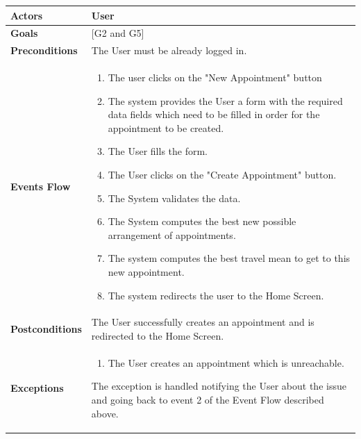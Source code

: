 \documentclass[12pt]{article}
\begin{document}
\begin{center}
    \begin{tabular} { |p{}|p{}| }
        \hline
        \textbf{Actors} & User \\ 
        \hline
        \textbf{Goals} & {[G2 and G5]} \\ 
        \hline  
        \textbf{Preconditions} & The User must be already logged in. \\ 
        \hline
        \textbf{Events Flow} & \begin{enumerate}[topsep=0pt] 
                            \setlength{\itemsep}{0.5pt}
                            \item The user clicks on the "New Appointment" button
                            \item The system provides the User a form with the required data fields which need to be filled in order for the appointment to be created.
                            \item The User fills the form.
                            \item The User clicks on the "Create Appointment" button.
                            \item The System validates the data.
                            \item The System computes the best new possible arrangement of appointments.
                            \item The system computes the best travel mean to get to this new appointment.
                            \item The system redirects the user to the Home Screen.
                            \end{enumerate} \\
        \hline
        \textbf{Postconditions} & The User successfully creates an appointment and is redirected to the Home Screen. \\
        \hline
        \textbf{Exceptions} & \begin{enumerate}[topsep=0pt] 
                            \setlength{\itemsep}{0.5pt}
                            \item The User creates an appointment which is unreachable.
                            \end{enumerate} 
                            The exception is handled notifying the User about the issue and going back to event 2 of the Event Flow described above.\\ 
        \hline
    \end{tabular}
\end{center}
\end{document}
